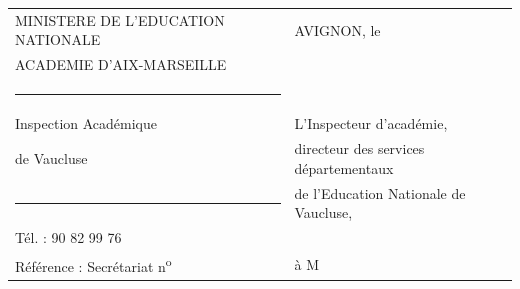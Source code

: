 \noindent\begin{tabular}{@{}l@{\qquad}l@{}}
MINISTERE DE L'EDUCATION NATIONALE & AVIGNON, le\\
ACADEMIE D'AIX-MARSEILLE &\\
\multicolumn{1}{c}{\rule{1.1cm}{0.4pt}} &\\
Inspection Académique & L'Inspecteur d'académie,\\
de Vaucluse & directeur des services départementaux\\
\multicolumn{1}{c}{\rule{1.1cm}{0.4pt}} & de l'Education Nationale de Vaucluse,\\
Tél. : 90 82 99 76 &\\
Référence : Secrétariat n\textsuperscript{o} & à M
\end{tabular}

